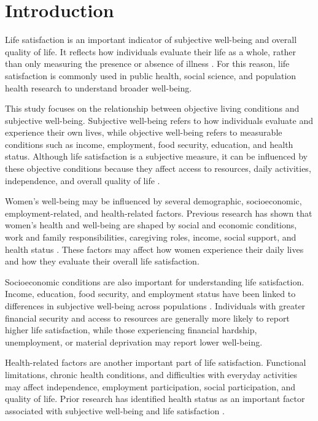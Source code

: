 \documentclass[12pt]{article}
\begin{document}
\section{Introduction}

Life satisfaction is an important indicator of subjective well-being and overall quality of life. It reflects how individuals evaluate their life as a whole, rather than only measuring the presence or absence of illness \citep{diener1984, kahneman2010}. For this reason, life satisfaction is commonly used in public health, social science, and population health research to understand broader well-being.

This study focuses on the relationship between objective living conditions and subjective well-being. Subjective well-being refers to how individuals evaluate and experience their own lives, while objective well-being refers to measurable conditions such as income, employment, food security, education, and health status. Although life satisfaction is a subjective measure, it can be influenced by these objective conditions because they affect access to resources, daily activities, independence, and overall quality of life \citep{diener1984, kahneman2010}.

Women's well-being may be influenced by several demographic, socioeconomic, employment-related, and health-related factors. Previous research has shown that women's health and well-being are shaped by social and economic conditions, work and family responsibilities, caregiving roles, income, social support, and health status \citep{denton2004, matud2014, bilodeau2025}. These factors may affect how women experience their daily lives and how they evaluate their overall life satisfaction.

Socioeconomic conditions are also important for understanding life satisfaction. Income, education, food security, and employment status have been linked to differences in subjective well-being across populations \citep{kahneman2010, clark1994, tarasuk2023}. Individuals with greater financial security and access to resources are generally more likely to report higher life satisfaction, while those experiencing financial hardship, unemployment, or material deprivation may report lower well-being.

Health-related factors are another important part of life satisfaction. Functional limitations, chronic health conditions, and difficulties with everyday activities may affect independence, employment participation, social participation, and quality of life. Prior research has identified health status as an important factor associated with subjective well-being and life satisfaction \citep{diener1984, denton2004}.
\end{document}
